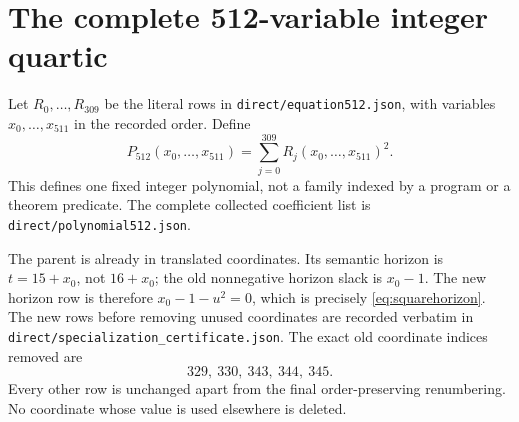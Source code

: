 \documentclass[11pt]{article}
\newcommand{\file}[1]{\nolinkurl{#1}}
\theoremstyle{definition}\newtheorem{definition}[theorem]{Definition}
\theoremstyle{remark}\newtheorem{remark}[theorem]{Remark}
\begin{document}
\section{The complete 512-variable integer quartic}
\label{sec:512}

Let $R_0,\ldots,R_{309}$ be the literal rows in
\file{direct/equation512.json}, with variables
$x_0,\ldots,x_{511}$ in the recorded order. Define
\[
 \boxed{P_{512}(x_0,\ldots,x_{511})
       =\sum_{j=0}^{309}R_j(x_0,\ldots,x_{511})^2.}
 \tag{11}\label{eq:P512}
\]
This defines one fixed integer polynomial, not a family indexed by a program
or a theorem predicate. The complete collected coefficient list is
\file{direct/polynomial512.json}.

The parent is already in translated coordinates. Its semantic horizon is
$t=15+x_0$, not $16+x_0$; the old nonnegative horizon slack is $x_0-1$.
The new horizon row is therefore $x_0-1-u^2=0$, which is precisely
\eqref{eq:squarehorizon}. The new rows before removing unused coordinates
are recorded verbatim in \file{direct/specialization_certificate.json}.
The exact old coordinate indices removed are
\[
 329,\ 330,\ 343,\ 344,\ 345.
\]
Every other row is unchanged apart from the final order-preserving renumbering.
No coordinate whose value is used elsewhere is deleted.
\end{document}
